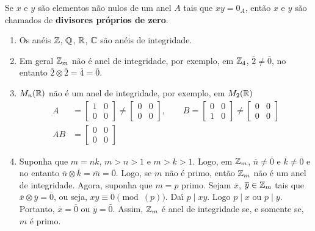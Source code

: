 \begin{observacao}
	Se $x$ e $y$ s{\~a}o elementos n{\~a}o nulos de um anel $A$ tais que $xy = 0_A$, ent{\~a}o $x$ e $y$ s{\~a}o chamados de \textbf{divisores pr{\'o}prios de zero}.
\end{observacao}


\begin{exemplos}
	\begin{enumerate}[label={\arabic*})]
		\item Os an{\'e}is $\mathbb{Z}$, $\mathbb{Q}$, $\mathbb{R}$, $\mathbb{C}$ s{\~a}o an{\'e}is de integridade.
		
		\item Em geral $\mathbb{Z}_m$ n{\~a}o {\'e} anel de integridade, por exemplo, em $\mathbb{Z}_4$, $\overline{2} \neq \overline{0}$, no entanto $\overline{2}\otimes \overline{2} = \overline{4} = \overline{0}$.
		
		\item $M_{n}(\mathbb{R})$ n{\~a}o {\'e} um anel de integridade, por exemplo, em $M_{2}(\mathbb{R})$
		\begin{align*}
			A &= \begin{bmatrix}
				1 & 0\\
				0 & 0
			\end{bmatrix} \neq \begin{bmatrix}
				0 & 0\\
				0 & 0		
			\end{bmatrix},\qquad 
			B = \begin{bmatrix}
				0 & 0\\
				1 & 0
			\end{bmatrix} \neq \begin{bmatrix}
				0 & 0\\
				0 & 0
			\end{bmatrix}\\
			AB & =\begin{bmatrix}
				0 & 0\\
				0 & 0
			\end{bmatrix}
		\end{align*}

		\item Suponha que $m = nk$, $m > n > 1$ e $m > k > 1$. Logo, em $\mathbb{Z}_m$, $\overline{n} \neq \overline{0}$ e $\overline{k} \neq \overline{0}$ e no entanto $\overline{n} \otimes \overline{k} = \overline{m} = \overline{0}$. Logo, se $m$ n{\~a}o {\'e} primo, ent{\~a}o $\mathbb{Z}_m$ n{\~a}o {\'e} um anel de integridade. Agora, suponha que $m = p$ primo. Sejam $\overline{x}$, $\overline{y} \in \mathbb{Z}_m$ tais que $\overline{x}\otimes \overline{y} = \overline{0}$, ou seja, $xy \equiv 0 \pmod(p)$. Da{\'\i} $p\mid xy$. Logo $p\mid x$ ou $p\mid y$. Portanto, $\overline{x} = \overline{0}$ ou $\overline{y} = \bar{0}$. Assim, $\mathbb{Z}_m$ {\'e} anel de integridade se, e somente se, $m$ {\'e} primo.
	\end{enumerate}
\end{exemplos}




